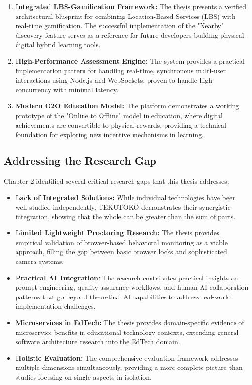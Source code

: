 \begin{enumerate}
    \item \textbf{Integrated LBS-Gamification Framework:} The thesis presents a verified architectural blueprint for combining Location-Based Services (LBS) with real-time gamification. The successful implementation of the "Nearby" discovery feature serves as a reference for future developers building physical-digital hybrid learning tools.
    
    \item \textbf{High-Performance Assessment Engine:} The system provides a practical implementation pattern for handling real-time, synchronous multi-user interactions using Node.js and WebSockets, proven to handle high concurrency with minimal latency.
    
    \item \textbf{Modern O2O Education Model:} The platform demonstrates a working prototype of the "Online to Offline" model in education, where digital achievements are convertible to physical rewards, providing a technical foundation for exploring new incentive mechanisms in learning.
\end{enumerate}

\subsection{Addressing the Research Gap}

Chapter 2 identified several critical research gaps that this thesis addresses:

\begin{itemize}
    \item \textbf{Lack of Integrated Solutions:} While individual technologies have been well-studied independently, TEKUTOKO demonstrates their synergistic integration, showing that the whole can be greater than the sum of parts.
    
    \item \textbf{Limited Lightweight Proctoring Research:} The thesis provides empirical validation of browser-based behavioral monitoring as a viable approach, filling the gap between basic browser locks and sophisticated camera systems.
    
    \item \textbf{Practical AI Integration:} The research contributes practical insights on prompt engineering, quality assurance workflows, and human-AI collaboration patterns that go beyond theoretical AI capabilities to address real-world implementation challenges.
    
    \item \textbf{Microservices in EdTech:} The thesis provides domain-specific evidence of microservice benefits in educational technology contexts, extending general software architecture research into the EdTech domain.
    
    \item \textbf{Holistic Evaluation:} The comprehensive evaluation framework addresses multiple dimensions simultaneously, providing a more complete picture than studies focusing on single aspects in isolation.
\end{itemize}

